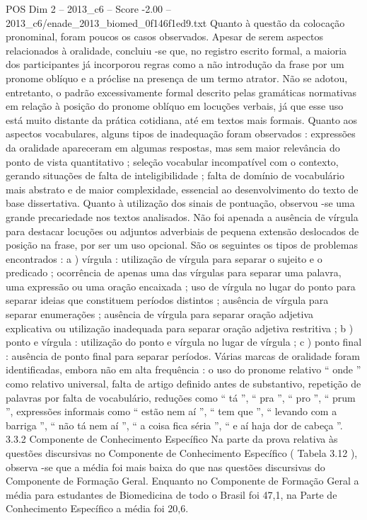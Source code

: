 \begin{textsample}{POS Dim 2 – 2013\_c6 – Score -2.00 – 2013\_c6/enade\_2013\_biomed\_0f146f1ed9.txt}
Quanto à questão da colocação pronominal, foram poucos os casos observados.
Apesar de serem aspectos relacionados à oralidade, concluiu -se que, no registro escrito formal, a maioria dos participantes já incorporou regras como a não introdução da frase por um pronome oblíquo e a próclise na presença de um termo atrator.
Não se adotou, entretanto, o padrão excessivamente formal descrito pelas gramáticas normativas em relação à posição do pronome oblíquo em locuções verbais, já que esse uso está muito distante da prática cotidiana, até em textos mais formais.
Quanto aos aspectos vocabulares, alguns tipos de inadequação foram observados : expressões da oralidade apareceram em algumas respostas, mas sem maior relevância do ponto de vista quantitativo ; seleção vocabular incompatível com o contexto, gerando situações de falta de inteligibilidade ; falta de domínio de vocabulário mais abstrato e de maior complexidade, essencial ao desenvolvimento do texto de base dissertativa.
Quanto à utilização dos sinais de pontuação, observou -se uma grande precariedade nos textos analisados.
Não foi apenada a ausência de vírgula para destacar locuções ou adjuntos adverbiais de pequena extensão deslocados de posição na frase, por ser um uso opcional.
São os seguintes os tipos de problemas encontrados : a ) vírgula : utilização de vírgula para separar o sujeito e o predicado ; ocorrência de apenas uma das vírgulas para separar uma palavra, uma expressão ou uma oração encaixada ; uso de vírgula no lugar do ponto para separar ideias que constituem períodos distintos ; ausência de vírgula para separar enumerações ; ausência de vírgula para separar oração adjetiva explicativa ou utilização inadequada para separar oração adjetiva restritiva ; b ) ponto e vírgula : utilização do ponto e vírgula no lugar de vírgula ; c ) ponto final : ausência de ponto final para separar períodos.
Várias marcas de oralidade foram identificadas, embora não em alta frequência : o uso do pronome relativo “ onde ” como relativo universal, falta de artigo definido antes de substantivo, repetição de palavras por falta de vocabulário, reduções como “ tá ”, “ pra ”, “ pro ”, “ prum ”, expressões informais como “ estão nem aí ”, “ tem que ”, “ levando com a barriga ”, “ não tá nem aí ”, “ a coisa fica séria ”, “ e aí haja dor de cabeça ”. 3.3.2 Componente de Conhecimento Específico Na parte da prova relativa às questões discursivas no Componente de Conhecimento Específico ( Tabela 3.12 ), observa -se que a média foi mais baixa do que nas questões discursivas do Componente de Formação Geral.
Enquanto no Componente de Formação Geral a média para estudantes de Biomedicina de todo o Brasil foi 47,1, na Parte de Conhecimento Específico a média foi 20,6.

\end{textsample}
